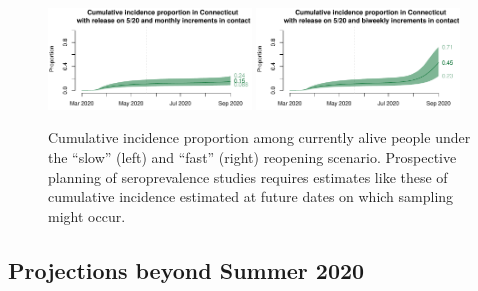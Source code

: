 \documentclass[11pt]{article}
\begin{document}
\begin{figure}
\centering
\includegraphics[width=0.48\textwidth]{figures/cumincidence_slow.pdf}
\includegraphics[width=0.48\textwidth]{figures/cumincidence_fast.pdf}
\caption{Cumulative incidence proportion among currently alive people under the ``slow'' (left) and ``fast'' (right) reopening scenario. Prospective planning of seroprevalence studies requires estimates like these of cumulative incidence estimated at future dates on which sampling might occur. }
\label{fig:cumincidence}
\end{figure}



\subsection*{Projections beyond Summer 2020}
\end{document}

